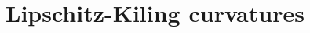 \documentclass[10]{beamer}
\begin{document}
  


\section{Lipschitz-Kiling curvatures}

\end{document}
